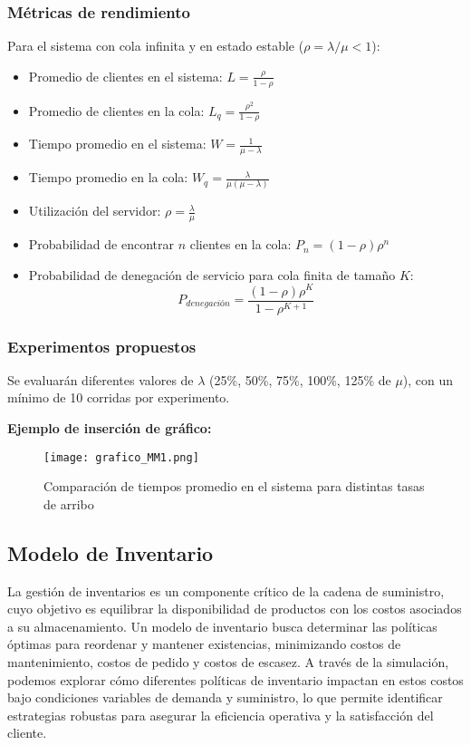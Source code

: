 \documentclass{article}
\begin{document}
\subsubsection*{Métricas de rendimiento}

Para el sistema con cola infinita y en estado estable (\( \rho = \lambda / \mu < 1 \)):

\begin{itemize}
    \item Promedio de clientes en el sistema: \( L = \frac{\rho}{1 - \rho} \)
    \item Promedio de clientes en la cola: \( L_q = \frac{\rho^2}{1 - \rho} \)
    \item Tiempo promedio en el sistema: \( W = \frac{1}{\mu - \lambda} \)
    \item Tiempo promedio en la cola: \( W_q = \frac{\lambda}{\mu(\mu - \lambda)} \)
    \item Utilización del servidor: \( \rho = \frac{\lambda}{\mu} \)
    \item Probabilidad de encontrar \( n \) clientes en la cola: \( P_n = (1 - \rho)\rho^n \)
    \item Probabilidad de denegación de servicio para cola finita de tamaño \( K \):
    \[
        P_{denegación} = \frac{(1 - \rho)\rho^K}{1 - \rho^{K+1}}
    \]
\end{itemize}

\subsubsection*{Experimentos propuestos}

Se evaluarán diferentes valores de \( \lambda \) (25\%, 50\%, 75\%, 100\%, 125\% de \( \mu \)), con un mínimo de 10 corridas por experimento.

\vspace{1em}
\textbf{Ejemplo de inserción de gráfico:}

\begin{figure}[H]
    \centering
    \texttt{[image: grafico\_MM1.png]}
    \caption{Comparación de tiempos promedio en el sistema para distintas tasas de arribo}
\end{figure}

\subsection{Modelo de Inventario}
La gestión de inventarios es un componente crítico de la cadena de suministro, cuyo objetivo es equilibrar la disponibilidad de productos con los costos asociados a su almacenamiento. Un modelo de inventario busca determinar las políticas óptimas para reordenar y mantener existencias, minimizando costos de mantenimiento, costos de pedido y costos de escasez. A través de la simulación, podemos explorar cómo diferentes políticas de inventario impactan en estos costos bajo condiciones variables de demanda y suministro, lo que permite identificar estrategias robustas para asegurar la eficiencia operativa y la satisfacción del cliente.
\end{document}
